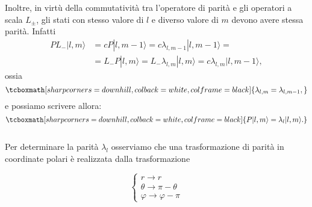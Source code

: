 Inoltre, in virtù della commutatività tra l'operatore di parità e gli operatori a scala $L_{\pm}$, gli stati con stesso valore di $l$ e diverso valore di $m$ devono avere stessa parità. Infatti
	\begin{align}
		 PL_-|l,m\rangle &=   cP|l,m-1\rangle=c\lambda_{l,m-1}|l,m-1\rangle=  \nonumber \\
		&=   L_-P|l,m\rangle=L_- \lambda_{l,m}|l,m\rangle=c\lambda_{l,m}|l,m-1\rangle ,
	\end{align}
ossia
	\begin{equation} 
		\tcboxmath[sharp corners=downhill, colback=white, colframe=black]{
			\lambda_{l,m}=\lambda_{l,m-1},
			}
	\end{equation}
e possiamo scrivere allora:
	\begin{equation} 
		\tcboxmath[sharp corners=downhill, colback=white, colframe=black]{
			P|l,m\rangle=\lambda_l|l,m \rangle.
			}
	\end{equation}\\
	
Per determinare la parità $\lambda_l$ osserviamo che una trasformazione di parità in coordinate polari è realizzata dalla trasformazione 

\begin{center}
\begin{minipage}[c]{0.35\textwidth}
\centering
\begin{equation}
\begin{cases} \nonumber
r \to r \\
\theta \to \pi-\theta \\
\varphi \to \varphi-\pi
\end{cases}
\end{equation}
\end{minipage}
\begin{minipage}{0.50\textwidth}
\centering
{}
%
%
\end{minipage}
\end{center}

